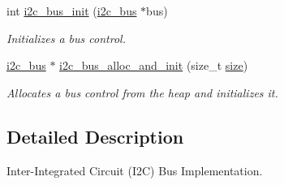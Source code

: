 \begin{DoxyCompactItemize}
int \mbox{\hyperlink{group__I2CBus_ga53427f41c12b16e164f944d99b7a9a25}{i2c\+\_\+bus\+\_\+init}} (\mbox{\hyperlink{structi2c__bus}{i2c\+\_\+bus}} $\ast$bus)
\begin{DoxyCompactList}\small\item\em Initializes a bus control. \end{DoxyCompactList}\item 
\mbox{\hyperlink{structi2c__bus}{i2c\+\_\+bus}} $\ast$ \mbox{\hyperlink{group__I2CBus_gaf66a22612850bee468de351d1635f28a}{i2c\+\_\+bus\+\_\+alloc\+\_\+and\+\_\+init}} (size\+\_\+t \mbox{\hyperlink{sun4u_2tte_8h_a245260f6f74972558f61b85227df5aae}{size}})
\begin{DoxyCompactList}\small\item\em Allocates a bus control from the heap and initializes it. \end{DoxyCompactList}\end{DoxyCompactItemize}


\subsection{Detailed Description}
Inter-\/\+Integrated Circuit (I2C) Bus Implementation. 

